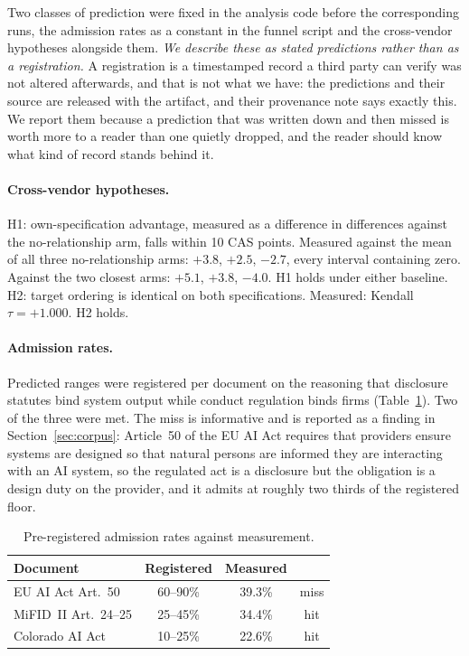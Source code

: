 \documentclass{article}
\begin{document}
Two classes of prediction were fixed in the analysis code before the corresponding runs, the
admission rates as a constant in the funnel script and the cross-vendor hypotheses alongside
them. \emph{We describe these as stated predictions rather than as a registration.} A
registration is a timestamped record a third party can verify was not altered afterwards, and
that is not what we have: the predictions and their source are released with the artifact, and
their provenance note says exactly this. We report them because a prediction that was written
down and then missed is worth more to a reader than one quietly dropped, and the reader should
know what kind of record stands behind it.

\paragraph{Cross-vendor hypotheses.}
H1: own-specification advantage, measured as a difference in differences against the
no-relationship arm, falls within 10 CAS points. Measured against the mean of all three
no-relationship arms: $+3.8$, $+2.5$, $-2.7$, every interval containing zero. Against the two
closest arms: $+5.1$, $+3.8$, $-4.0$. H1 holds under either baseline.
H2: target ordering is identical on both specifications. Measured: Kendall $\tau = +1.000$.
H2 holds.

\paragraph{Admission rates.}
Predicted ranges were registered per document on the reasoning that disclosure statutes bind
system output while conduct regulation binds firms (Table~\ref{tab:prereg}). Two of the three were met. The miss is informative and is reported as a finding in
Section~\ref{sec:corpus}: Article~50 of the EU AI Act requires that providers ensure systems
are designed so that natural persons are informed they are interacting with an AI system, so
the regulated act is a disclosure but the obligation is a design duty on the provider, and it
admits at roughly two thirds of the registered floor.

\begin{table}[h]
\centering
\small
\setlength{\tabcolsep}{6pt}
\caption{Pre-registered admission rates against measurement.}
\label{tab:prereg}
\begin{tabular}{@{}lccc@{}}
\toprule
\textbf{Document} & \textbf{Registered} & \textbf{Measured} & \\
\midrule
EU AI Act Art.~50 & 60--90\% & 39.3\% & miss \\
MiFID~II Art.~24--25 & 25--45\% & 34.4\% & hit \\
Colorado AI Act & 10--25\% & 22.6\% & hit \\
\bottomrule
\end{tabular}
\end{table}
\end{document}
